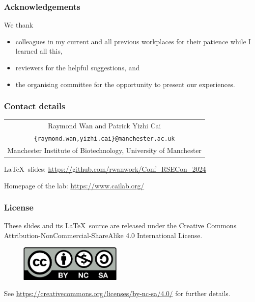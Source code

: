 \documentclass[11pt,aspectratio=43,ignorenonframetext,t]{beamer}
\begin{document}
\begin{frame}

\frametitle{Acknowledgements}

We thank
\begin{itemize}
  \item colleagues in my current and all previous workplaces for their patience while I learned all this,
  \item reviewers for the helpful suggestions, and
  \item the organising committee for the opportunity to present our experiences.
\end{itemize}

\end{frame}


\begin{frame}

\frametitle{Contact details}

\begin{table}
  \begin{tabular}{c}
  Raymond Wan and Patrick Yizhi Cai\\
  {\texttt{\{raymond.wan,yizhi.cai\}@manchester.ac.uk}}\\
  Manchester Institute of Biotechnology, University of Manchester\\
  \end{tabular}
\end{table}
\vs

\LaTeX\ slides:  \href{https://github.com/rwanwork/Conf_RSECon_2024}{https://github.com/rwanwork/Conf\_RSECon\_2024}
\vs

Homepage of the lab:  \href{https://www.cailab.org/}{https://www.cailab.org/}
\vs

\begin{center}
  {}
\end{center}

\end{frame}


\begin{frame}

\frametitle{License}

These slides and its \LaTeX\ source are released under the Creative Commons Attribution-NonCommercial-ShareAlike 4.0 International License.
\vs

\begin{figure}
  \centering
  \includegraphics[width=5cm]{imgs/by-nc-sa}
\end{figure}

See \href{https://creativecommons.org/licenses/by-nc-sa/4.0/}{https://creativecommons.org/licenses/by-nc-sa/4.0/} for further details.

\end{frame}
\end{document}
